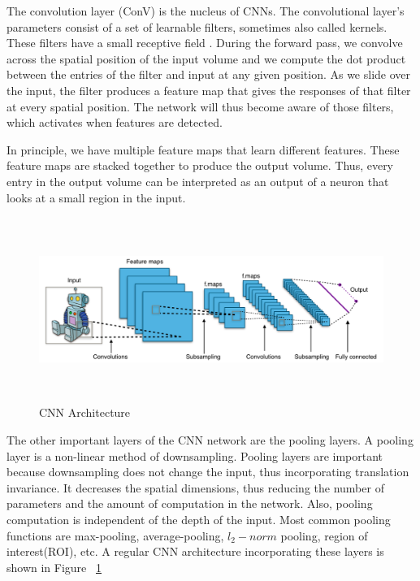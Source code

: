 The convolution layer (ConV) is the nucleus of CNNs. The convolutional layer's parameters consist of a set of learnable filters, sometimes also called kernels. These filters have a small receptive field \cite{karparthy}. During the forward pass, we convolve across the spatial position of the input volume and we compute the dot product between the entries of the filter and input at any given position. As we slide over the input, the filter produces a feature map that gives the responses of that filter at every spatial position. The network will thus become aware of those filters, which activates when features are detected. 

In principle, we have multiple feature maps that learn different features. These feature maps are stacked together to produce the output volume. Thus, every entry in the output volume can be interpreted as an output of a neuron that looks at a small region in the input. %

\begin{figure}[ht]
    \centering
    \includegraphics[width=1.0\linewidth, height=6cm]{BachelorMasterThesis/TheoreticalBackground/Figures/Typical_CNN_Architecture.png}
    \caption{CNN Architecture \cite{wiki:xxx}}
    \label{fig:a_cnn_architecture}
\end{figure}

The other important layers of the CNN network are the pooling layers. A pooling layer is a non-linear method of downsampling. Pooling layers are important because downsampling does not change the input, thus incorporating translation invariance. It decreases the spatial dimensions, thus reducing the number of parameters and the amount of computation in the network. Also, pooling computation is independent of the depth of the input. Most common pooling functions are max-pooling, average-pooling, $l_2-norm$ pooling, region of interest(ROI), etc. A regular CNN architecture incorporating these layers is shown in Figure ~\ref{fig:a_cnn_architecture}

